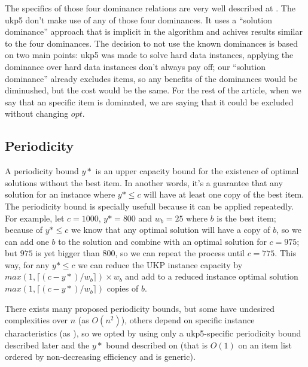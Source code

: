 \documentclass[runningheads,a4paper]{llncs}
\begin{document}
The specifics of those four dominance relations are very well described at \cite{CPYA}. The ukp5 don't make use of any of those four dominances. It uses a ``solution dominance'' approach that is implicit in the algorithm and achives results similar to the four dominances. The decision to not use the known dominances is based on two main points: ukp5 was made to solve hard data instances, applying the dominance over hard data instances don't always pay off; our ``solution dominance'' already excludes items, so any benefits of the dominances would be diminushed, but the cost would be the same. For the rest of the article, when we say that an specific item is dominated, we are saying that it could be excluded without changing \(opt\).



\subsection{Periodicity}

A periodicity bound \(y*\) is an upper capacity bound for the existence of optimal solutions without the best item. In another words, it's a guarantee that any solution for an instance where \(y* \leq c\) will have at least one copy of the best item. The periodicity bound is specially usefull because it can be applied repeatedly. For example, let \(c = 1000\), \(y* = 800\) and \(w_b = 25\) where \(b\) is the best item; because of \(y* \leq c\) we know that any optimal solution will have a copy of \(b\), so we can add one \(b\) to the solution and combine with an optimal solution for \(c = 975\); but \(975\) is yet bigger than \(800\), so we can repeat the process until \(c = 775\). This way, for any \(y* \leq c\) we can reduce the UKP instance capacity by \(max(1, \lceil(c-y*)/w_b\rceil)\times w_b\) and add to a reduced instance optimal solution \(max(1, \lceil(c-y*)/w_b\rceil)\) copies of \(b\).

There exists many proposed periodicity bounds, but some have undesired complexities over \(n\) (as \(O(n^2)\)\cite{CBADBOUND}), others depend on specific instance characteristics (as \cite{BADBOUND2}\cite{CPYA}), so we opted by using only a ukp5-specific periodicity bound described later and the \(y*\) bound described on \cite[p. 223]{CGAR} (that is \(O(1)\) on an item list ordered by non-decreasing efficiency and is generic).
\end{document}
